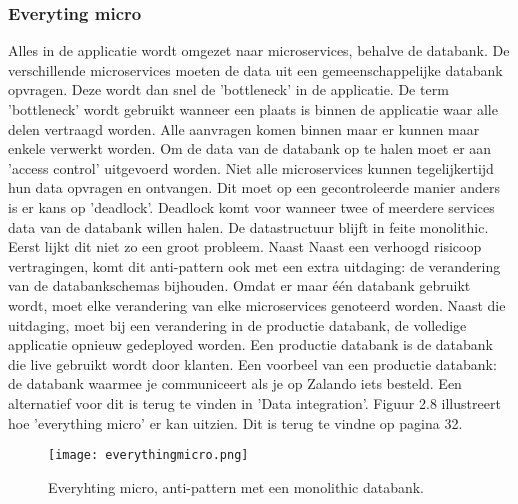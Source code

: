 \subsubsection{Everyting micro}
Alles in de applicatie wordt omgezet naar microservices, behalve de databank. De verschillende microservices moeten de data uit een gemeenschappelijke databank opvragen. Deze wordt dan snel de 'bottleneck' in de applicatie. De term 'bottleneck' wordt gebruikt wanneer een plaats is binnen de applicatie waar alle delen vertraagd worden. Alle aanvragen komen binnen maar er kunnen maar enkele verwerkt worden.
Om de data van de databank op te halen moet er aan 'access control' uitgevoerd worden. Niet alle microservices kunnen tegelijkertijd hun data opvragen en ontvangen.
Dit moet op een gecontroleerde manier anders is er kans op 'deadlock'. Deadlock komt voor wanneer twee of meerdere services data van de databank willen halen. 
De datastructuur blijft in feite monolithic.
Eerst lijkt dit niet zo een groot probleem. Naast Naast een verhoogd risicoop vertragingen, komt dit anti-pattern ook met een extra uitdaging: de verandering van de databankschemas bijhouden. Omdat er maar één databank gebruikt wordt, moet elke verandering van elke microservices genoteerd worden. Naast die uitdaging, moet bij een verandering in de productie databank, de volledige applicatie opnieuw gedeployed worden. Een productie databank is de databank die live gebruikt wordt door klanten. Een voorbeel van een productie databank: de databank waarmee je communiceert als je op Zalando iets besteld. Een alternatief voor dit is terug te vinden in 'Data integration'.
Figuur 2.8 illustreert hoe 'everything micro' er kan uitzien. Dit is terug te vindne op pagina 32.
\begin{figure}[h!]
	\texttt{[image: everythingmicro.png]}
	\centering
	\caption{Everyhting micro, anti-pattern met een monolithic databank. \textcite{Monson2019}}
\end{figure}

